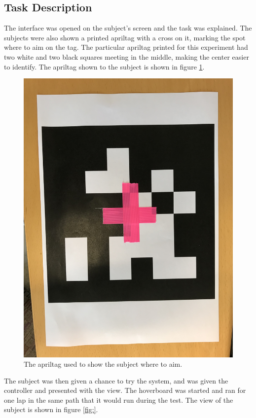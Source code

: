 \documentclass[nofilelist]{cslthse-msc}
\begin{document}
\subsection{Task Description}
The interface was opened on the subject's screen and the task was explained. The subjects were also shown a printed apriltag with a cross on it, marking the spot where to aim on the tag. The particular apriltag printed for this experiment had two white and two black squares meeting in the middle, making the center easier to identify. The apriltag shown to the subject is shown in figure \ref{fig:apriltag}.

\begin{figure}[!hbt]
   \centering
   \includegraphics[scale=0.08]{images/apriltag.jpg} 
   \caption{The apriltag used to show the subject where to aim.}
   \label{fig:apriltag}
\end{figure}

The subject was then given a chance to try the system, and was given the controller and presented with the view. The hoverboard was started and ran for one lap in the same path that it would run during the test. The view of the subject is shown in figure \ref{fig:}.
\end{document}
